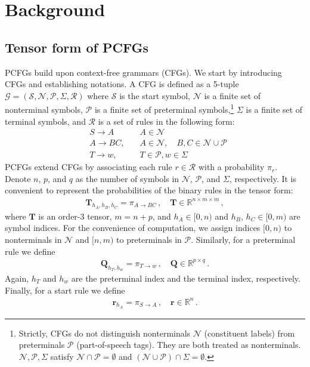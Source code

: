 \documentclass[11pt]{article}
\begin{document}
\section{Background}

\subsection{Tensor form of PCFGs}\label{sec:t-pcfg}
PCFGs build upon context-free grammars (CFGs). 
We start by introducing CFGs and establishing notations.
A CFG is defined as a 5-tuple $\mathcal{G} = (\mathcal{S},\mathcal{N}, \mathcal{P},\Sigma, \mathcal{R})$ where $\mathcal{S}$ is the start symbol, $\mathcal{N}$ is a finite set of nonterminal symbols, $\mathcal{P}$ is a finite set of preterminal symbols,\footnote{Strictly, CFGs do not distinguish nonterminals $\mathcal{N}$ (constituent labels) from preterminals $\mathcal{P}$ (part-of-speech tags). 
	They are both treated as nonterminals. 
	$\mathcal{N}, \mathcal{P}, \Sigma$ satisfy $\mathcal{N}\cap\mathcal{P}=\emptyset$ and $(\mathcal{N}\cup\mathcal{P})\cap\Sigma=\emptyset$.} 
$\Sigma$ is a finite set of terminal symbols, and $\mathcal{R}$ is a set of rules in the following form:
\begin{align*}
&S \rightarrow A   & \quad A \in \mathcal{N} \\
&A \rightarrow B C, &\quad A \in \mathcal{N}, \quad B, C \in \mathcal{N} \cup \mathcal{P} \\ &T\rightarrow w, & \quad T \in \mathcal{P}, w \in \Sigma  
\end{align*}
PCFGs extend CFGs by associating each rule $r\in\mathcal{R}$ with a probability $\pi_{r}$.
Denote $n$, $p$, and $q$ 
as the number of symbols in $\mathcal{N}$, $\mathcal{P}$, and $\Sigma$, respectively. 
It is convenient to represent the probabilities of the binary rules in the tensor form:
\begin{align*}
\mathbf{T}_{h_A, h_B, h_C} = \pi_{A\rightarrow BC}\,,\quad\mathbf{T}\in\mathbb{R}^{n\times m\times m}\,,
\end{align*}
where $\mathbf{T}$ is an order-3 tensor, $m = n + p$, and
$h_A\in[0, n)$ and $h_B$, $h_C\in[0, m)$ are symbol indices.
For the convenience of computation, 
we assign indices $[0, n)$ to nonterminals in $\mathcal{N}$ and $[n, m)$ to preterminals in $\mathcal{P}$.
Similarly, for a preterminal rule we define
\begin{align*}
\mathbf{Q}_{h_T, h_w} = \pi_{T\rightarrow w}\,,\quad\mathbf{Q}\in\mathbb{R}^{p\times q}\,.
\end{align*}
Again, $h_T$ and $h_w$ are the preterminal index and the terminal index, respectively. Finally, for a start rule we define
\begin{align*}
\mathbf{r}_{h_A} = \pi_{S\rightarrow A}\,,\quad\mathbf{r}\in\mathbb{R}^{n}\,.
\end{align*}
\end{document}
